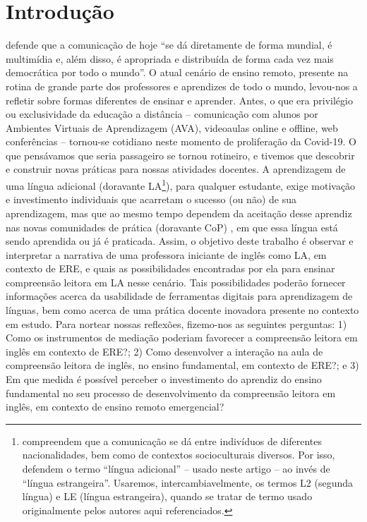 \documentclass{textolivre}
\begin{document}
\section{Introdução}\label{sec-intro}
\textcite[p. 2]{levy2016} defende que a comunicação de hoje “se dá diretamente de forma mundial, é multimídia e, além disso, é apropriada e distribuída de forma cada vez mais democrática por todo o mundo”. O atual cenário de ensino remoto, presente na rotina de grande parte dos professores e aprendizes de todo o mundo, levou-nos a refletir sobre formas diferentes de ensinar e aprender. Antes, o que era privilégio ou exclusividade da educação a distância – comunicação com alunos por Ambientes Virtuais de Aprendizagem (AVA), videoaulas online e offline, web conferências – tornou-se cotidiano neste momento de proliferação da Covid-19. O que pensávamos que seria passageiro se tornou rotineiro, e tivemos que descobrir e construir novas práticas para nossas atividades docentes. A aprendizagem de uma língua adicional (doravante LA\footnote{\textcite{schlatter2012} compreendem que a comunicação se dá entre indivíduos de diferentes nacionalidades, bem como de contextos socioculturais diversos. Por isso, defendem o termo “língua adicional” – usado neste artigo – ao invés de “língua estrangeira”. Usaremos, intercambiavelmente, os termos L2 (segunda língua) e LE (língua estrangeira), quando se tratar de termo usado originalmente pelos autores aqui referenciados.}), para qualquer estudante, exige motivação e investimento \cite{darvin2016} individuais que acarretam o sucesso (ou não) de sua aprendizagem, mas que ao mesmo tempo dependem da aceitação desse aprendiz nas novas comunidades de prática (doravante CoP) \cite{wenger1998}, em que essa língua está sendo aprendida ou já é praticada. Assim, o objetivo deste trabalho é observar e interpretar a narrativa de uma professora iniciante de inglês como LA, em contexto de ERE, e quais as possibilidades encontradas por ela para ensinar compreensão leitora em LA nesse cenário. Tais possibilidades poderão fornecer informações acerca da usabilidade de ferramentas digitais para aprendizagem de línguas, bem como acerca de uma prática docente inovadora presente no contexto em estudo. Para nortear nossas reflexões, fizemo-nos as seguintes perguntas: 1) Como os instrumentos de mediação poderiam favorecer a compreensão leitora em inglês em contexto de ERE?; 2) Como desenvolver a interação na aula de compreensão leitora de inglês, no ensino fundamental, em contexto de ERE?; e 3) Em que medida é possível perceber o investimento do aprendiz do ensino fundamental no seu processo de desenvolvimento da compreensão leitora em inglês, em contexto de ensino remoto emergencial?
\end{document}
